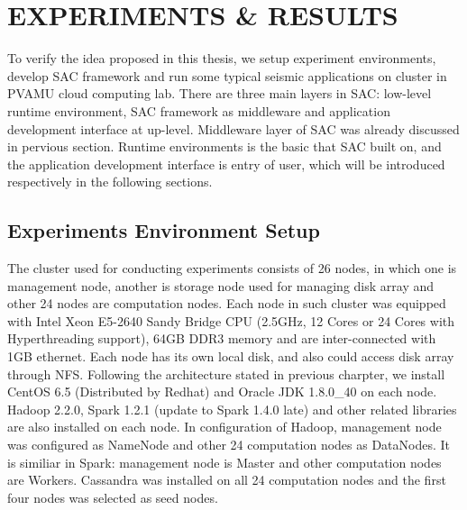 %
%
%


\chapter{\uppercase{Experiments \& Results}}
To verify the idea proposed in this thesis, we setup experiment environments, develop SAC framework and run some typical seismic applications on cluster in PVAMU cloud computing lab. There are three main layers in SAC: low-level runtime environment, SAC framework as middleware and application development interface at up-level. Middleware layer of SAC was already discussed in pervious section. Runtime environments is the basic that SAC built on, and the application development interface is entry of user, which will be introduced respectively in the following sections.

\section{Experiments Environment Setup}

The cluster used for conducting experiments consists of 26 nodes, in which one is management node, another is storage node used for managing disk array and other 24 nodes are computation nodes. Each node in such cluster was equipped with Intel Xeon E5-2640 Sandy Bridge CPU (2.5GHz, 12 Cores or 24 Cores with Hyperthreading support), 64GB DDR3 memory and are inter-connected with 1GB ethernet. Each node has its own local disk, and also could access disk array through NFS. Following the architecture stated in previous charpter, we install CentOS 6.5 (Distributed by Redhat) and Oracle JDK 1.8.0\_40 on each node. Hadoop 2.2.0, Spark 1.2.1 (update to Spark 1.4.0 late) and other related libraries are also installed on each node. In configuration of Hadoop, management node was configured as NameNode and other 24 computation nodes as DataNodes. It is similiar in Spark: management node is Master and other computation nodes are Workers. Cassandra was installed on all 24 computation nodes and the first four nodes was selected as seed nodes.

